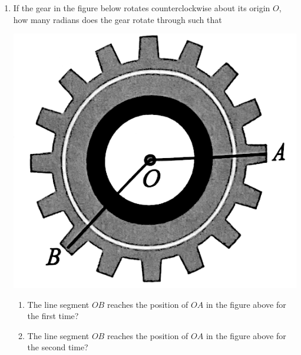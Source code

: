 \documentclass{report}
\begin{document}
\begin{enumerate}
    \item If the gear in the figure below rotates counterclockwise about its origin $O$, how many radians does the gear rotate through such that
    \begin{center}
        \includegraphics[scale=0.2]{assets/8-5.png}
    \end{center}
    \begin{enumerate}
        \item The line segment $OB$ reaches the position of $OA$ in the figure above for the first time?
        \item The line segment $OB$ reaches the position of $OA$ in the figure above for the second time?
    \end{enumerate}
\end{enumerate}
\end{document}
